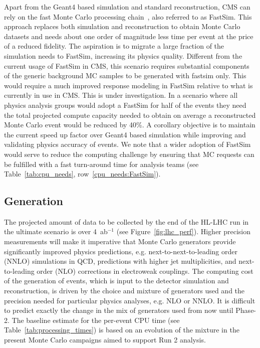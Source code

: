 \documentclass{cmspaper}
\begin{document}
Apart from the Geant4 based simulation and standard reconstruction, CMS can rely on the fast Monte Carlo processing chain~\cite{Sekmen:2242542}, also referred to as FastSim. This approach replaces both simulation and reconstruction to obtain Monte Carlo datasets and needs about one order of magnitude less time per event at the price of a reduced fidelity. The aspiration is to migrate a large fraction of the simulation needs to FastSim, increasing its physics quality. 
Different from the current usage of FastSim in CMS, this scenario requires substantial components of the generic background MC samples to be generated with fastsim only. This would require a much improved response modeling in FastSim relative to what is currently in use in CMS. This is under investigation.
In a scenario where all physics analysis groups would adopt a FastSim for half of the events they need the total projected compute capacity needed to obtain on average a reconstructed Monte Carlo event would be reduced by 40\%. A corollary objective is to maintain the current speed up factor over Geant4 based simulation while improving and validating physics accuracy of events. We note that a wider adoption of FastSim would serve to reduce the computing challenge by ensuring that MC requests can be fulfilled with a fast turn-around time for analysis teams (see Table~\ref{tab:cpu_needs}, row~\ref{cpu_needs:FastSim}).

\subsection{Generation}
\label{subsec:cpu_needs_gen}
The projected amount of data to be collected by the end of the HL-LHC run in the ultimate scenario is over 4~ab$^{-1}$ (see Figure~\ref{fig:lhc_perf}). Higher precision measurements will make it imperative that Monte Carlo generators provide significantly improved physics predictions, e.g. next-to-next-to-leading order (NNLO) simulations in QCD, predictions with higher jet multiplicities, and next-to-leading order (NLO) corrections in electroweak couplings. The computing cost of the generation of events, which is input to the detector simulation and reconstruction, is driven by the choice and mixture of generators used and the precision needed for particular physics analyses, e.g. NLO or NNLO. It is difficult to predict exactly the change in the mix of generators used from now until Phase-2. The baseline estimate for the per-event CPU time (see Table~\ref{tab:processing_times}) is based on an evolution of the mixture in the present Monte Carlo campaigns aimed to support Run 2 analysis. 
\end{document}

